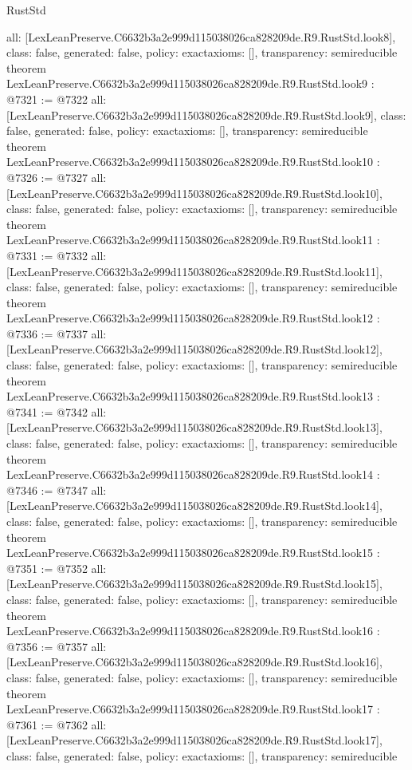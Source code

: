 \begin{lexlean}{RustStd}
\begin{coremodule}
{  all: [LexLeanPreserve.C6632b3a2e999d115038026ca828209de.R9.RustStd.look8],
  class: false,
  generated: false,
  policy: exact{axioms: []},
  transparency: semireducible
}
theorem LexLeanPreserve.C6632b3a2e999d115038026ca828209de.R9.RustStd.look9 : @7321 := @7322 {
  all: [LexLeanPreserve.C6632b3a2e999d115038026ca828209de.R9.RustStd.look9],
  class: false,
  generated: false,
  policy: exact{axioms: []},
  transparency: semireducible
}
theorem LexLeanPreserve.C6632b3a2e999d115038026ca828209de.R9.RustStd.look10 : @7326 := @7327 {
  all: [LexLeanPreserve.C6632b3a2e999d115038026ca828209de.R9.RustStd.look10],
  class: false,
  generated: false,
  policy: exact{axioms: []},
  transparency: semireducible
}
theorem LexLeanPreserve.C6632b3a2e999d115038026ca828209de.R9.RustStd.look11 : @7331 := @7332 {
  all: [LexLeanPreserve.C6632b3a2e999d115038026ca828209de.R9.RustStd.look11],
  class: false,
  generated: false,
  policy: exact{axioms: []},
  transparency: semireducible
}
theorem LexLeanPreserve.C6632b3a2e999d115038026ca828209de.R9.RustStd.look12 : @7336 := @7337 {
  all: [LexLeanPreserve.C6632b3a2e999d115038026ca828209de.R9.RustStd.look12],
  class: false,
  generated: false,
  policy: exact{axioms: []},
  transparency: semireducible
}
theorem LexLeanPreserve.C6632b3a2e999d115038026ca828209de.R9.RustStd.look13 : @7341 := @7342 {
  all: [LexLeanPreserve.C6632b3a2e999d115038026ca828209de.R9.RustStd.look13],
  class: false,
  generated: false,
  policy: exact{axioms: []},
  transparency: semireducible
}
theorem LexLeanPreserve.C6632b3a2e999d115038026ca828209de.R9.RustStd.look14 : @7346 := @7347 {
  all: [LexLeanPreserve.C6632b3a2e999d115038026ca828209de.R9.RustStd.look14],
  class: false,
  generated: false,
  policy: exact{axioms: []},
  transparency: semireducible
}
theorem LexLeanPreserve.C6632b3a2e999d115038026ca828209de.R9.RustStd.look15 : @7351 := @7352 {
  all: [LexLeanPreserve.C6632b3a2e999d115038026ca828209de.R9.RustStd.look15],
  class: false,
  generated: false,
  policy: exact{axioms: []},
  transparency: semireducible
}
theorem LexLeanPreserve.C6632b3a2e999d115038026ca828209de.R9.RustStd.look16 : @7356 := @7357 {
  all: [LexLeanPreserve.C6632b3a2e999d115038026ca828209de.R9.RustStd.look16],
  class: false,
  generated: false,
  policy: exact{axioms: []},
  transparency: semireducible
}
theorem LexLeanPreserve.C6632b3a2e999d115038026ca828209de.R9.RustStd.look17 : @7361 := @7362 {
  all: [LexLeanPreserve.C6632b3a2e999d115038026ca828209de.R9.RustStd.look17],
  class: false,
  generated: false,
  policy: exact{axioms: []},
  transparency: semireducible
}
\end{coremodule}
\end{lexlean}
